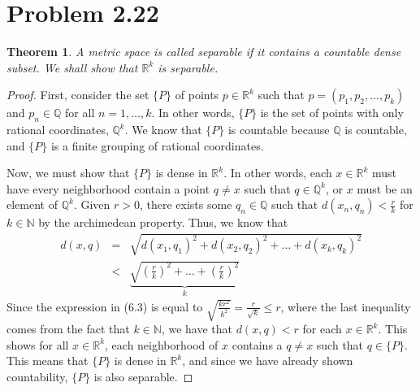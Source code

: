 \documentclass[psamsfonts]{amsart}
\newtheorem{thm}{Theorem}[section]
\theoremstyle{definition}
\theoremstyle{remark}
\numberwithin{equation}{section}
\begin{document}
\section{Problem 2.22}

\begin{thm}
A metric space is called \textit{separable} if it contains a countable dense subset. We shall show that $\mathbb{R}^k$ is separable. 
\end{thm}

\begin{proof}
First, consider the set $\{ P \}$ of points $p \in \mathbb{R}^k$ such that $ p = (p_1, p_2,\dots,p_k)$ and $p_n \in \mathbb{Q}$ for all $n = 1,\ldots,k$. In other words, $\{P\}$ is the set of points with only rational coordinates, $\mathbb{Q}^k$. We know that $\{P\}$ is countable because $\mathbb{Q}$ is countable, and $\{P\}$ is a finite grouping of rational coordinates. 

Now, we must show that $\{P\}$ is dense in $\mathbb{R}^k$. In other words, each $x \in \mathbb{R}^k$ must have every neighborhood contain a point $q \neq x$ such that $q \in \mathbb{Q}^k$, or $x$ must be an element of $\mathbb{Q}^k$. Given $r>0$, there exists some $q_n \in \mathbb{Q}$ such that $d(x_n,q_n) < \frac{r}{k}$ for $k \in \mathbb{N}$ by the archimedean property. Thus, we know that 
\begin{eqnarray}
d(x,q) &=& \sqrt{d(x_1,q_1)^2 + d(x_2,q_2)^2 + \ldots + d(x_k,q_k)^2} \\
&<& \underbrace{\sqrt{ \left(\frac{r}{k}\right)^2 + \ldots + \left(\frac{r}{k} \right)^2}}_{k}
\end{eqnarray}
Since the expression in (6.3) is equal to $\sqrt{\frac{k r^2}{k^2}} = \frac{r}{\sqrt{k}} \leq r$, where the last inequality comes from the fact that $k \in \mathbb{N}$, we have that $d(x,q) < r$ for each $x \in \mathbb{R}^k$. This shows for all $x \in \mathbb{R}^k$, each neighborhood of $x$ contains a $q \neq x$ such that $ q \in \{ P \}$. This means that $\{P\}$ is dense in $\mathbb{R}^k$, and since we have already shown countability, $\{P\}$ is also separable.  
\end{proof}
\end{document}
